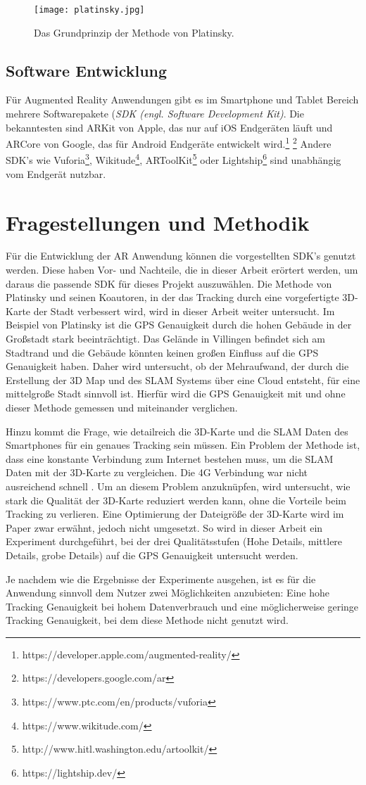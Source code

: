 \begin{figure}[h]
    \centering
    \texttt{[image: platinsky.jpg]}
    \caption{Das Grundprinzip der Methode von Platinsky.}
    \label{fig:PlatinskyPrinzip}
\end{figure}

\subsection{Software Entwicklung}
Für Augmented Reality Anwendungen gibt es im Smartphone und Tablet Bereich mehrere Softwarepakete (\textit{SDK (engl. Software Development Kit)}. Die bekanntesten sind ARKit von Apple, das nur auf iOS Endgeräten läuft und ARCore von Google, das für Android Endgeräte entwickelt wird.\footnote{https://developer.apple.com/augmented-reality/} \footnote{https://developers.google.com/ar} Andere SDK's wie Vuforia\footnote{https://www.ptc.com/en/products/vuforia}, Wikitude\footnote{https://www.wikitude.com/}, ARToolKit\footnote{http://www.hitl.washington.edu/artoolkit/} oder Lightship\footnote{https://lightship.dev/} sind unabhängig vom Endgerät nutzbar.  

\section{Fragestellungen und Methodik}
Für die Entwicklung der AR Anwendung können die vorgestellten SDK's genutzt werden. Diese haben Vor- und Nachteile, die in dieser Arbeit erörtert werden, um daraus die passende SDK für dieses Projekt auszuwählen. Die Methode von Platinsky und seinen Koautoren\cite{platinsky}, in der das Tracking durch eine vorgefertigte 3D-Karte der Stadt verbessert wird, wird in dieser Arbeit weiter untersucht. Im Beispiel von Platinsky ist die GPS Genauigkeit durch die hohen Gebäude in der Großstadt stark beeinträchtigt. Das Gelände in Villingen befindet sich am Stadtrand und die Gebäude könnten keinen großen Einfluss auf die GPS Genauigkeit haben. Daher wird untersucht, ob der Mehraufwand, der durch die Erstellung der 3D Map und des SLAM Systems über eine Cloud entsteht, für eine mittelgroße Stadt sinnvoll ist. Hierfür wird die GPS Genauigkeit mit und ohne dieser Methode gemessen und miteinander verglichen.

Hinzu kommt die Frage, wie detailreich die 3D-Karte und die SLAM Daten des Smartphones für ein genaues Tracking sein müssen. Ein Problem der Methode ist, dass eine konstante Verbindung zum Internet bestehen muss, um die SLAM Daten mit der 3D-Karte zu vergleichen. Die 4G Verbindung war nicht ausreichend schnell \cite*[][sinngemäß aus]{platinsky}. Um an diesem Problem anzuknüpfen, wird untersucht, wie stark die Qualität der 3D-Karte reduziert werden kann, ohne die Vorteile beim Tracking zu verlieren. Eine Optimierung der Dateigröße der 3D-Karte wird im Paper zwar erwähnt, jedoch nicht umgesetzt. So wird in dieser Arbeit ein Experiment durchgeführt, bei der drei Qualitätsstufen (Hohe Details, mittlere Details, grobe Details) auf die GPS Genauigkeit untersucht werden. 

Je nachdem wie die Ergebnisse der Experimente ausgehen, ist es für die Anwendung sinnvoll dem Nutzer zwei Möglichkeiten anzubieten: Eine hohe Tracking Genauigkeit bei hohem Datenverbrauch und eine möglicherweise geringe Tracking Genauigkeit, bei dem diese Methode nicht genutzt wird.
